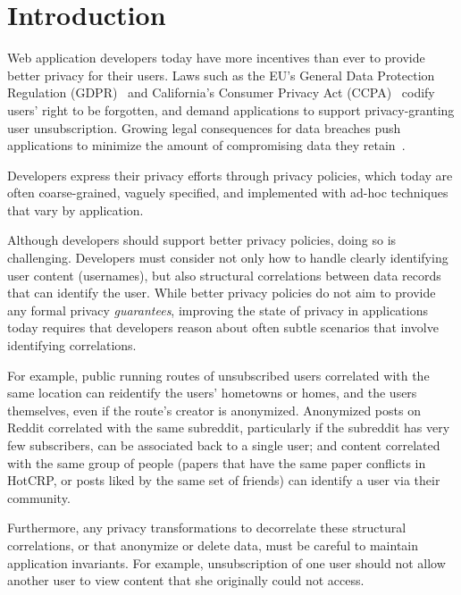 \section{Introduction}
Web application developers today have more incentives than ever to provide better privacy for their
users.
%
Laws such as the EU's General Data Protection Regulation (GDPR)~\cite{eu:gdpr} and California's
Consumer Privacy Act (CCPA)~\cite{ca:privacy-act} codify users' right to be forgotten, and demand
applications to support privacy-granting user unsubscription.
%
Growing legal consequences for data breaches push applications to minimize the amount of
compromising data they retain~\cite{breach:amazon,breach:twitter, breach:fb, breach:marriott,
breach:quora}.

Developers express their privacy efforts through privacy policies, which today are often
coarse-grained, vaguely specified, and implemented with ad-hoc techniques that vary by application.

Although developers should support better privacy policies, doing so is challenging.  Developers
must consider not only how to handle clearly identifying user content (\eg usernames), but also
structural correlations between data records that can identify the user.  While better privacy
policies do not aim to provide any formal privacy \emph{guarantees}, improving the state of privacy
in applications today requires that developers reason about often subtle scenarios that involve
identifying correlations.

For example, public running routes of unsubscribed users correlated with the same location can
reidentify the users' hometowns or homes, and the users themselves, even if the route's creator is
anonymized. Anonymized posts on Reddit correlated with the same subreddit, particularly if the
subreddit has very few subscribers, can be associated back to a single user; and
content correlated with the same group of people (\eg papers that have the same paper conflicts in
HotCRP, or posts liked by the same set of friends) can identify a user via their community.

Furthermore, any privacy transformations to decorrelate these structural correlations, or that
anonymize or delete data, must be careful to maintain application invariants. For example,
unsubscription of one user should not allow another user to view content that she originally could
not access.


